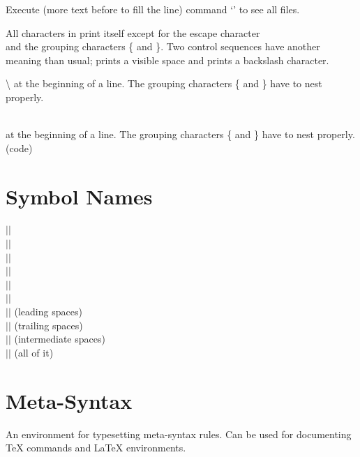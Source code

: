 \documentclass{article}
\begin{document}
Execute (more text before \code{\\code} to fill the line) command
‘’
to see all files.

All characters in  print itself except for the escape
character \code\\ and the grouping characters \code\{ and \code\}.
Two control sequences have another meaning than usual; \code{\\\ }
prints a visible space and \code{\\\\} prints a backslash character.

\textbackslash{} at the beginning of a line.  The grouping
characters \{ and \} have to nest properly.

\code\\ at the beginning of a line.  The grouping
characters \code\{ and \code\} have to nest properly. (code)


\section{Symbol Names}

$|$\symb{\code}$|$ \\
$|$\symb{\code*}$|$ \\
$|$$|$ \\
$|$$|$ \\
$|$$|$ \\
$|$$|$ \\
$|$$|$ (leading spaces) \\
$|$$|$ (trailing spaces) \\
$|$$|$ (intermediate spaces) \\
$|$$|$ (all of it)


\section{Meta-Syntax}

An environment for typesetting meta-syntax rules.  Can be used for
documenting \TeX{} commands and \LaTeX{} environments.
\end{document}

